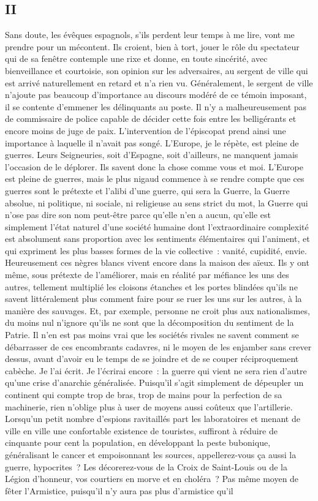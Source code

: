 \documentclass[french,twoside]{book} %
\begin{document}
\subsection[{II}]{II}
\noindent Sans doute, les évêques espagnols, s’ils perdent leur temps à me lire, vont me prendre pour un mécontent. Ils croient, bien à tort, jouer le rôle du spectateur qui de sa fenêtre contemple une rixe et donne, en toute sincérité, avec bienveillance et courtoisie, son opinion sur les adversaires, au sergent de ville qui est arrivé naturellement en retard et n’a rien vu. Généralement, le sergent de ville n’ajoute pas beaucoup d’importance au discours modéré de ce témoin imposant, il se contente d’emmener les délinquants au poste. Il n’y a malheureusement pas de commissaire de police capable de décider cette fois entre les belligérants et encore moins de juge de paix. L’intervention de l’épiscopat prend ainsi une importance à laquelle il n’avait pas songé. L’Europe, je le répète, est pleine de guerres. Leurs Seigneuries, soit d’Espagne, soit d’ailleurs, ne manquent jamais l’occasion de le déplorer. Ils savent donc la chose comme vous et moi. L’Europe est pleine de guerres, mais le plus nigaud commence à se rendre compte que ces guerres sont le prétexte et l’alibi d’une guerre, qui sera la Guerre, la Guerre absolue, ni politique, ni sociale, ni religieuse au sens strict du mot, la Guerre qui n’ose pas dire son nom peut-être parce qu’elle n’en a aucun, qu’elle est simplement l’état naturel d’une société humaine dont l’extraordinaire complexité est absolument sans proportion avec les sentiments élémentaires qui l’animent, et qui expriment les plus basses formes de la vie collective : vanité, cupidité, envie. Heureusement ces nègres blancs vivent encore dans la maison des aïeux. Ils y ont même, sous prétexte de l’améliorer, mais en réalité par méfiance les uns des autres, tellement multiplié les cloisons étanches et les portes blindées qu’ils ne savent littéralement plus comment faire pour se ruer les uns sur les autres, à la manière des sauvages. Et, par exemple, personne ne croit plus aux nationalismes, du moins nul n’ignore qu’ils ne sont que la décomposition du sentiment de la Patrie. Il n’en est pas moins vrai que les sociétés rivales ne savent comment se débarrasser de ces encombrants cadavres, ni le moyen de les enjamber sans crever dessus, avant d’avoir eu le temps de se joindre et de se couper réciproquement cabèche. Je l’ai écrit. Je l’écrirai encore : la guerre qui vient ne sera rien d’autre qu’une crise d’anarchie généralisée. Puisqu’il s’agit simplement de dépeupler un continent qui compte trop de bras, trop de mains pour la perfection de sa machinerie, rien n’oblige plus à user de moyens aussi coûteux que l’artillerie. Lorsqu’un petit nombre d’espions ravitaillés part les laboratoires et menant de ville en ville une confortable existence de touristes, suffiront à réduire de cinquante pour cent la population, en développant la peste bubonique, généralisant le cancer et empoisonnant les sources, appellerez-vous ça aussi la guerre, hypocrites ? Les décorerez-vous de la Croix de Saint-Louis ou de la Légion d’honneur, vos courtiers en morve et en choléra ? Pas même moyen de fêter l’Armistice, puisqu’il n’y aura pas plus d’armistice qu’il 
\end{document}
